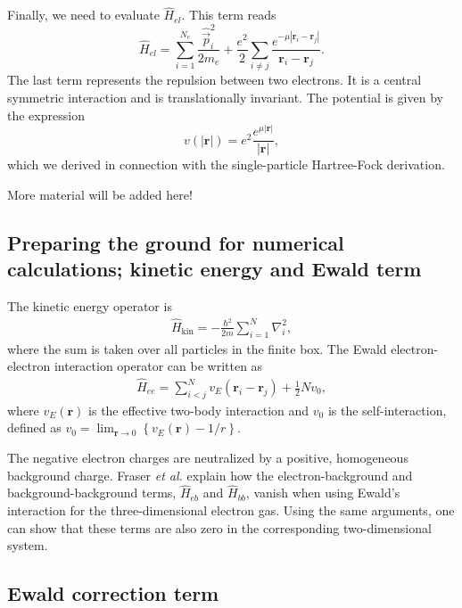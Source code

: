 \documentclass[%
oneside,                 %
final,                   %
10pt]{article}
\newenvironment{doconceexercise}{}{}
\begin{document}
\begin{doconceexercise}
Finally, we need to evaluate $\hat H_{el}$. This term reads
\[ 
\hat H_{el} = \sum_{i=1}^{N_e} \frac{\hat{\vec p}_i^2}{2m_e} + \frac{e^2}{2} \sum_{i \neq j} \frac{e^{-\mu |\mathbf{r}_i - \mathbf{r}_j|}}{\mathbf{r}_i - \mathbf{r}_j} . 
\]
The last term represents the repulsion between two electrons. It is a central symmetric interaction
and is translationally invariant. The potential is given by the expression
\[ 
v(|\mathbf{r}|) = e^2 \frac{e^{\mu|\mathbf{r}|}}{|\mathbf{r}|}, 
\]
which we derived in connection with the single-particle Hartree-Fock derivation.

More material will be added here!





\end{doconceexercise}


\subsection{Preparing the ground for numerical calculations; kinetic energy and Ewald term}

The kinetic energy operator is
\begin{align}
  \hat{H}_{\text{kin}} = -\frac{\hbar^{2}}{2m}\sum_{i=1}^{N}\nabla_{i}^{2},
\end{align}
where the sum is taken over all particles in the finite
box. The Ewald electron-electron interaction operator 
can be written as 
\begin{align}
  \hat{H}_{ee} = \sum_{i < j}^{N} v_{E}\left( \mathbf{r}_{i}-\mathbf{r}_{j}\right)
  + \frac{1}{2}Nv_{0},
\end{align}
where $v_{E}(\mathbf{r})$ is the effective two-body 
interaction and $v_{0}$ is the self-interaction, defined 
as $v_{0} = \lim_{\mathbf{r} \rightarrow 0} \left\{ v_{E}(\mathbf{r}) - 1/r\right\} $. 

The negative 
electron charges are neutralized by a positive, homogeneous 
background charge. Fraser \emph{et al.} explain how the
electron-background and background-background terms, 
$\hat{H}_{eb}$ and $\hat{H}_{bb}$, vanish
when using Ewald's interaction for the three-dimensional
electron gas. Using the same arguments, one can show that
these terms are also zero in the corresponding 
two-dimensional system. 




\subsection{Ewald correction term}
\end{document}
